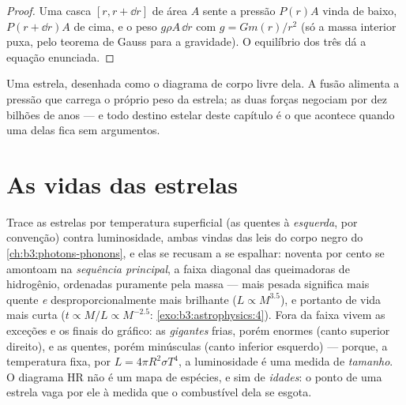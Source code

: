 \begin{proof}
Uma casca $[r, r + \dd r]$ de área $A$ sente a pressão $P(r)A$ vinda
de baixo, $P(r + \dd r)A$ de cima, e o peso $g\rho A\,\dd r$
com $g = Gm(r)/r^2$ (só a massa interior puxa, pelo teorema de
Gauss para a gravidade). O equilíbrio dos três dá a
equação enunciada.
\end{proof}

\begin{omfigure}

{\small Uma estrela, desenhada como o diagrama de corpo livre dela. A
fusão alimenta a pressão que carrega o próprio peso da estrela; as duas
forças negociam por dez bilhões de anos --- e todo destino estelar deste
capítulo é o que acontece quando uma delas fica sem argumentos.}
\end{omfigure}

\section{As vidas das estrelas}

\begin{definition}\label{def:b3:astrophysics:hr}
Trace as estrelas por temperatura superficial (as quentes à
\emph{esquerda}, por convenção) contra luminosidade, ambas vindas das
leis do corpo negro do \cref{ch:b3:photons-phonons}, e elas se recusam a
se espalhar: noventa por cento se amontoam na \emph{sequência
principal}, a faixa diagonal das queimadoras de hidrogênio, ordenadas
puramente pela massa --- mais pesada significa mais quente \emph{e}
desproporcionalmente mais brilhante ($L \propto M^{3.5}$), e portanto de
vida mais curta ($t \propto M/L \propto M^{-2.5}$:
\cref{exo:b3:astrophysics:4}). Fora da faixa vivem as
exceções e os finais do gráfico: as \emph{gigantes} frias, porém enormes
(canto superior direito), e as \emph{} quentes, porém
minúsculas (canto inferior esquerdo) --- porque, a temperatura fixa, por
$L = 4\pi R^2\sigma T^4$, a luminosidade é uma medida de \emph{tamanho}.
O diagrama HR não é um mapa de espécies, e sim de \emph{idades}: o ponto
de uma estrela vaga por ele à medida que o combustível dela se esgota.
\end{definition}

